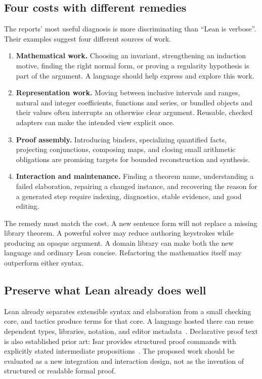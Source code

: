 \documentclass[11pt,letterpaper]{article}
\begin{document}
\subsection{Four costs with different remedies}
The reports' most useful diagnosis is more discriminating than ``Lean is verbose''.
Their examples suggest four different sources of work.

\begin{enumerate}
\item \textbf{Mathematical work.} Choosing an invariant, strengthening an induction
  motive, finding the right normal form, or proving a regularity hypothesis is
  part of the argument. A language should help express and explore this work.
\item \textbf{Representation work.} Moving between inclusive intervals and ranges,
  natural and integer coefficients, functions and series, or bundled objects and
  their values often interrupts an otherwise clear argument. Reusable, checked
  adapters can make the intended view explicit once.
\item \textbf{Proof assembly.} Introducing binders, specializing quantified facts,
  projecting conjunctions, composing maps, and closing small arithmetic obligations
  are promising targets for bounded reconstruction and synthesis.
\item \textbf{Interaction and maintenance.} Finding a theorem name, understanding a
  failed elaboration, repairing a changed instance, and recovering the reason for
  a generated step require indexing, diagnostics, stable evidence, and good editing.
\end{enumerate}

The remedy must match the cost. A new sentence form will not replace a missing
library theorem. A powerful solver may reduce authoring keystrokes while producing
an opaque argument. A domain library can make both the new language and ordinary
Lean concise. Refactoring the mathematics itself may outperform either syntax.

\subsection{Preserve what Lean already does well}
Lean already separates extensible syntax and elaboration from a small checking
core, and tactics produce terms for that core. A language hosted there can reuse
dependent types, libraries, notation, and editor metadata~\cite{lean-elab}.
Declarative proof text is also established prior art: Isar provides structured
proof commands with explicitly stated intermediate propositions~\cite{isar}.
The proposed work should be evaluated as a new integration and interaction design,
not as the invention of structured or readable formal proof.
\end{document}
